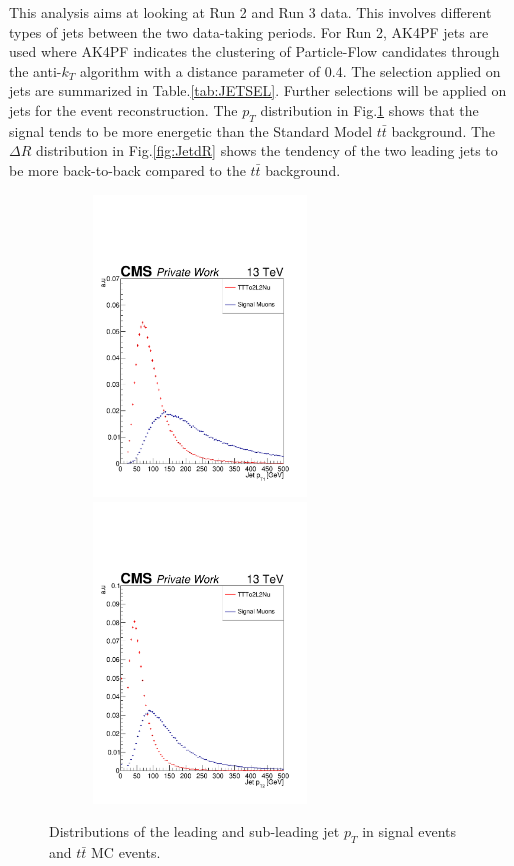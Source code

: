 \documentclass{cernatlasnote}
\begin{document}
    This analysis aims at looking at Run 2 and Run 3 data. This involves different types of jets between the two data-taking periods. For Run 2, AK4PF jets are used where AK4PF indicates the clustering of Particle-Flow candidates through the anti-$k_T$ algorithm \cite{ANTIKT} with a distance parameter of 0.4. The selection applied on jets are summarized in Table.\ref{tab:JETSEL}. Further selections will be applied on jets for the event reconstruction. The $p_T$  distribution in Fig.\ref{fig:JetPt} shows that the signal tends to be more energetic than the Standard Model $t\bar{t}$ background. The $\Delta R$   distribution in Fig.\ref{fig:JetdR} shows the tendency of the two leading jets to be more back-to-back compared to the $t\bar{t}$ background.
\begin{figure}[ht]
\centering
\includegraphics[height=8cm, width=8cm, trim= 0cm 0cm 0cm 0.cm,clip]{images/Jet/JetLeadingPt.pdf}\includegraphics[height=8cm, width=8cm, trim= 0cm 0cm 0cm 0.cm,clip]{images/Jet/JetLeadingPt2.pdf}
\caption{\label{fig:JetPt} Distributions of the leading and sub-leading jet $p_T$ in signal events and $t\bar{t}$ MC events.}
\end{figure}
\FloatBarrier
\end{document}
